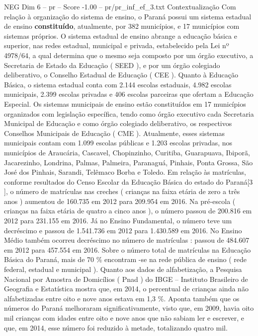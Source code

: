 \begin{textsample}{NEG Dim 6 – pr – Score -1.00 – pr/pr\_inf\_ef\_3.txt}  \label{ex:f6_neg_261}
Contextualização Com relação à organização do sistema de ensino, o Paraná possui um sistema estadual de ensino \textbf{constituído}, atualmente, por 382 municípios, e 17 municípios com sistemas próprios.
O sistema estadual de ensino abrange a educação básica e superior, nas redes estadual, municipal e privada, estabelecido pela Lei nº 4978/64, a qual determina que o mesmo seja composto por um órgão executivo, a Secretaria de Estado da Educação ( SEED ), e por um órgão colegiado deliberativo, o Conselho Estadual de Educação ( CEE ).
Quanto à Educação Básica, o sistema estadual conta com 2.144 escolas estaduais, 4.982 escolas municipais, 2.399 escolas privadas e 406 escolas parceiras que ofertam a Educação Especial.
Os sistemas municipais de ensino estão constituídos em 17 municípios organizados com legislação específica, tendo como órgão executivo cada Secretaria Municipal de Educação e como órgão colegiado deliberativo, os respectivos Conselhos Municipais de Educação ( CME ).
Atualmente, esses sistemas municipais contam com 1.099 escolas públicas e 1.203 escolas privadas, nos municípios de Araucária, Cascavel, Chopinzinho, Curitiba, Guarapuava, Ibiporã, Jacarezinho, Londrina, Palmas, Palmeira, Paranaguá, Pinhais, Ponta Grossa, São José dos Pinhais, Sarandi, Telêmaco Borba e Toledo.
Em relação às matrículas, conforme resultados do Censo Escolar da Educação Básica do estado do Paraná[3 ], o número de matrículas nas creches ( crianças na faixa etária de zero a três anos ) aumentou de 160.735 em 2012 para 209.954 em 2016.
Na pré-escola ( crianças na faixa etária de quatro a cinco anos ), o número passou de 200.816 em 2012 para 231.155 em 2016.
Já no Ensino Fundamental, o número teve um decréscimo e passou de 1.541.736 em 2012 para 1.430.589 em 2016.
No Ensino Médio também ocorreu decréscimo no número de matrículas : passou de 484.607 em 2012 para 457.554 em 2016.
Sobre o número total de matrículas na Educação Básica do Paraná, mais de 70 \% encontram -se na rede pública de ensino ( rede federal, estadual e municipal ).
Quanto aos dados de alfabetização, a Pesquisa Nacional por Amostra de Domicílios ( Pnad ) do IBGE – Instituto Brasileiro de Geografia e Estatística mostra que, em 2014, o percentual de crianças ainda não alfabetizadas entre oito e nove anos estava em 1,3 \%.
Aponta também que os números do Paraná melhoraram significativamente, visto que, em 2009, havia oito mil crianças com idades entre oito e nove anos que não sabiam ler e escrever, e que, em 2014, esse número foi reduzido à metade, totalizando quatro mil.

\end{textsample}
